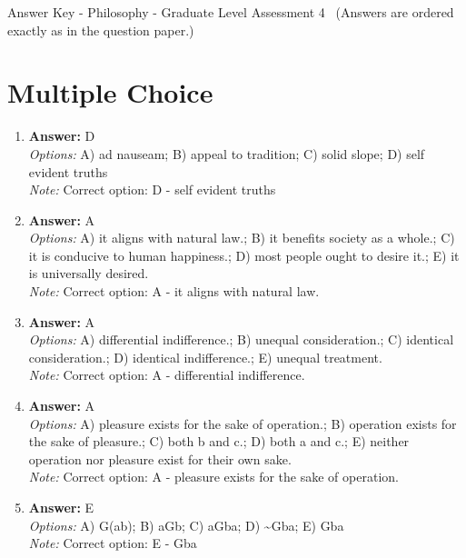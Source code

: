 \documentclass[12pt]{article}
\begin{document}
\begin{center}
Answer Key - Philosophy - Graduate Level Assessment 4 \
\small (Answers are ordered exactly as in the question paper.)
\end{center}

\section*{Multiple Choice}
\begin{enumerate}[label=\arabic*.]
\item \textbf{Answer:} D
\\ \textit{Options:} A) ad nauseam; B) appeal to tradition; C) solid slope; D) self evident truths
\\ \textit{Note:} Correct option: D - self evident truths
\item \textbf{Answer:} A
\\ \textit{Options:} A) it aligns with natural law.; B) it benefits society as a whole.; C) it is conducive to human happiness.; D) most people ought to desire it.; E) it is universally desired.
\\ \textit{Note:} Correct option: A - it aligns with natural law.
\item \textbf{Answer:} A
\\ \textit{Options:} A) differential indifference.; B) unequal consideration.; C) identical consideration.; D) identical indifference.; E) unequal treatment.
\\ \textit{Note:} Correct option: A - differential indifference.
\item \textbf{Answer:} A
\\ \textit{Options:} A) pleasure exists for the sake of operation.; B) operation exists for the sake of pleasure.; C) both b and c.; D) both a and c.; E) neither operation nor pleasure exist for their own sake.
\\ \textit{Note:} Correct option: A - pleasure exists for the sake of operation.
\item \textbf{Answer:} E
\\ \textit{Options:} A) G(ab); B) aGb; C) aGba; D) \textasciitilde{}Gba; E) Gba
\\ \textit{Note:} Correct option: E - Gba
\end{enumerate}
\end{document}

